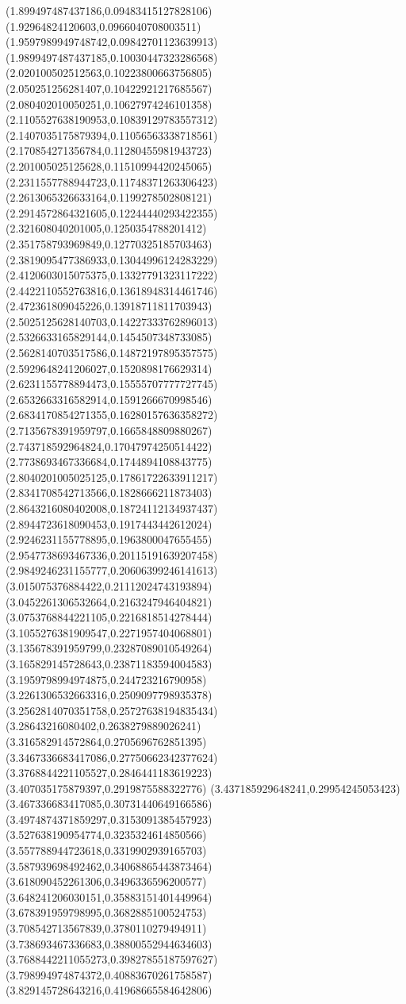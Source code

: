 {(1.899497487437186,0.09483415127828106)
(1.92964824120603,0.0966040708003511)
(1.9597989949748742,0.09842701123639913)
(1.9899497487437185,0.10030447323286568)
(2.020100502512563,0.10223800663756805)
(2.050251256281407,0.10422921217685567)
(2.080402010050251,0.10627974246101358)
(2.1105527638190953,0.10839129783557312)
(2.1407035175879394,0.11056563338718561)
(2.170854271356784,0.11280455981943723)
(2.201005025125628,0.11510994420245065)
(2.2311557788944723,0.11748371263306423)
(2.2613065326633164,0.1199278502808121)
(2.2914572864321605,0.12244440293422355)
(2.321608040201005,0.1250354788201412)
(2.351758793969849,0.12770325185703463)
(2.3819095477386933,0.13044996124283229)
(2.4120603015075375,0.13327791323117222)
(2.4422110552763816,0.13618948314461746)
(2.472361809045226,0.13918711811703943)
(2.5025125628140703,0.14227333762896013)
(2.5326633165829144,0.1454507348733085)
(2.5628140703517586,0.14872197895357575)
(2.5929648241206027,0.1520898176629314)
(2.6231155778894473,0.15555707777727745)
(2.6532663316582914,0.1591266670998546)
(2.6834170854271355,0.16280157636358272)
(2.7135678391959797,0.1665848809880267)
(2.743718592964824,0.17047974250514422)
(2.7738693467336684,0.1744894108843775)
(2.8040201005025125,0.17861722633911217)
(2.8341708542713566,0.1828666211873403)
(2.8643216080402008,0.18724112134937437)
(2.8944723618090453,0.1917443442612024)
(2.9246231155778895,0.1963800047655455)
(2.9547738693467336,0.20115191639207458)
(2.9849246231155777,0.20606399246141613)
(3.015075376884422,0.21112024743193894)
(3.0452261306532664,0.2163247946404821)
(3.0753768844221105,0.2216818514278444)
(3.1055276381909547,0.2271957404068801)
(3.135678391959799,0.23287089010549264)
(3.165829145728643,0.23871183594004583)
(3.1959798994974875,0.244723216790958)
(3.2261306532663316,0.2509097798935378)
(3.2562814070351758,0.25727638194835434)
(3.28643216080402,0.2638279889026241)
(3.316582914572864,0.2705696762851395)
(3.3467336683417086,0.27750662342377624)
(3.3768844221105527,0.2846441183619223)
(3.407035175879397,0.2919875588322776)
(3.437185929648241,0.29954245053423)
(3.467336683417085,0.30731440649166586)
(3.4974874371859297,0.3153091385457923)
(3.527638190954774,0.3235324614850566)
(3.557788944723618,0.3319902939165703)
(3.587939698492462,0.34068865443873464)
(3.618090452261306,0.3496336596200577)
(3.648241206030151,0.35883151401449964)
(3.678391959798995,0.3682885100524753)
(3.708542713567839,0.3780110279494911)
(3.738693467336683,0.38800552944634603)
(3.7688442211055273,0.39827855187597627)
(3.798994974874372,0.40883670261758587)
(3.829145728643216,0.41968665584642806)
}
